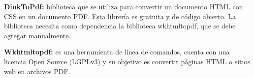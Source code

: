 \textbf{DinkToPdf: } biblioteca que se utiliza para convertir un documento HTML con CSS en un documento PDF. Esta librería es gratuita y de código abierto. La biblioteca necesita como dependencia la biblioteca wkhtmltopdf, que se debe agregar manualmente.

\textbf{Wkhtmltopdf: } es una herramienta de línea de comandos, cuenta con una licencia Open Source (LGPLv3) y su objetivo es convertir páginas HTML o sitios web en archivos PDF.